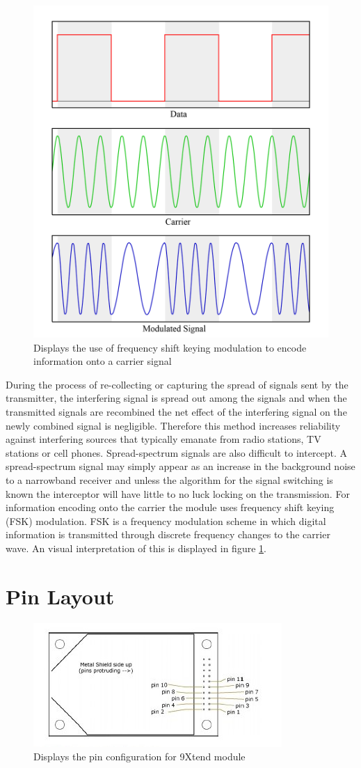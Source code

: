\documentclass[paper=a4, fontsize=11pt]{scrartcl}
\numberwithin{equation}{section}		%
\numberwithin{figure}{section}			%
\numberwithin{table}{section}				%
\begin{document}
\begin{figure}[h!]
\centering
\includegraphics[width=0.25\linewidth]{fsk}
\caption{Displays the use of frequency shift keying modulation to encode information onto a carrier signal \cite{picfsk}}
\label{fsk}
\end{figure}
During the process of re-collecting or capturing the spread of signals sent by the transmitter, the interfering signal is spread out among the signals and when the transmitted signals are recombined the net effect of the interfering signal on the newly combined signal is negligible. Therefore this method increases reliability against interfering sources that typically emanate from radio stations, TV stations or cell phones. Spread-spectrum signals are also difficult to intercept. A spread-spectrum signal may simply appear as an increase in the background noise to a narrowband receiver and unless the algorithm for the signal switching is known the interceptor will have little to no luck locking on the transmission. For information encoding onto the carrier the module uses frequency shift keying (FSK) modulation. FSK is a frequency modulation scheme in which digital information is transmitted through discrete frequency changes to the carrier wave. An visual interpretation of this is displayed in figure \ref{fsk}.
\section{Pin Layout}

\begin{figure}[H]
\centering
\includegraphics[width=0.5\linewidth]{spec1}
\caption{Displays the pin configuration for 9Xtend module \cite{man}}
\label{spec1}
\end{figure}
\end{document}
